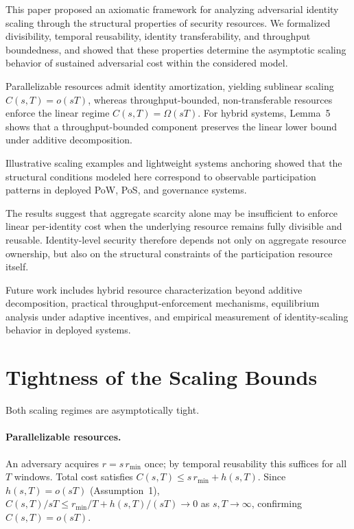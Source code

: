 \documentclass[journal]{IEEEtran}
\begin{document}
This paper proposed an axiomatic framework for analyzing
adversarial identity scaling through the structural properties
of security resources. We formalized divisibility, temporal
reusability, identity transferability, and throughput boundedness,
and showed that these properties determine the asymptotic
scaling behavior of sustained adversarial cost within the
considered model.

Parallelizable resources admit identity amortization, yielding
sublinear scaling $C(s,T)=o(sT)$, whereas throughput-bounded,
non-transferable resources enforce the linear regime
$C(s,T)=\Omega(sT)$. For hybrid systems, Lemma~5 shows
that a throughput-bounded component preserves the linear
lower bound under additive decomposition.

Illustrative scaling examples and lightweight systems anchoring
showed that the structural conditions modeled here correspond
to observable participation patterns in deployed PoW, PoS,
and governance systems.

The results suggest that aggregate scarcity alone may be
insufficient to enforce linear per-identity cost when the
underlying resource remains fully divisible and reusable.
Identity-level security therefore depends not only on aggregate
resource ownership, but also on the structural constraints of
the participation resource itself.

Future work includes hybrid resource characterization beyond
additive decomposition, practical throughput-enforcement
mechanisms, equilibrium analysis under adaptive incentives,
and empirical measurement of identity-scaling behavior in
deployed systems.
	\appendices
	
	\section{Tightness of the Scaling Bounds}
	
	Both scaling regimes are asymptotically tight.
	
	\paragraph{Parallelizable resources.}
	An adversary acquires $r = s\,r_{\min}$ once; by temporal
	reusability this suffices for all $T$ windows.
	Total cost satisfies $C(s,T) \le s\,r_{\min} + h(s,T)$.
	Since $h(s,T)=o(sT)$ (Assumption~1),
	$C(s,T)/sT \le r_{\min}/T + h(s,T)/(sT) \to 0$
	as $s,T\to\infty$, confirming $C(s,T)=o(sT)$.
	
\end{document}
